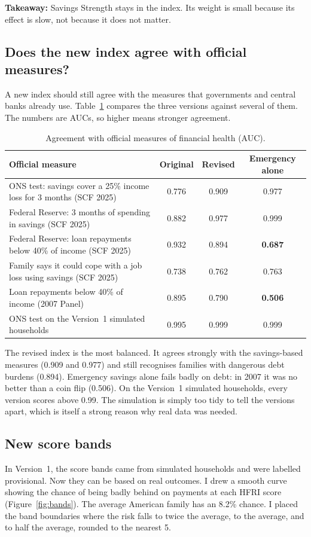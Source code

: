 \documentclass[11pt,a4paper]{article}
\newcommand{\takeaway}[1]{\par\smallskip\noindent\textbf{Takeaway:} #1\par\smallskip}
\newcommand{\pct}{\%}
\begin{document}
\takeaway{Savings Strength stays in the index. Its weight is small because its effect is slow, not because it does not
matter.}

\subsection{Does the new index agree with official measures?}
A new index should still agree with the measures that governments and central banks already use.
Table~\ref{tab:bench} compares the three versions against several of them. The numbers are AUCs, so higher means
stronger agreement.

\begin{table}[H]
\centering\small
\caption{Agreement with official measures of financial health (AUC).}
\label{tab:bench}
\begin{tabular}{>{\raggedright}p{8.4cm}ccc}
\toprule
Official measure & Original & Revised & Emergency alone\\
\midrule
ONS test: savings cover a 25\pct{} income loss for 3 months (SCF 2025) & 0.776 & 0.909 & 0.977\\
Federal Reserve: 3 months of spending in savings (SCF 2025) & 0.882 & 0.977 & 0.999\\
Federal Reserve: loan repayments below 40\pct{} of income (SCF 2025) & 0.932 & 0.894 & \textbf{0.687}\\
Family says it could cope with a job loss using savings (SCF 2025) & 0.738 & 0.762 & 0.763\\
Loan repayments below 40\pct{} of income (2007 Panel) & 0.895 & 0.790 & \textbf{0.506}\\
ONS test on the Version~1 simulated households & 0.995 & 0.999 & 0.999\\
\bottomrule
\end{tabular}
\end{table}

The revised index is the most balanced. It agrees strongly with the savings-based measures (0.909 and 0.977) and still
recognises families with dangerous debt burdens (0.894). Emergency savings alone fails badly on debt: in 2007 it was no
better than a coin flip (0.506). On the Version~1 simulated households, every version scores above 0.99. The simulation
is simply too tidy to tell the versions apart, which is itself a strong reason why real data was needed.

\subsection{New score bands}
In Version~1, the score bands came from simulated households and were labelled provisional. Now they can be based on
real outcomes. I drew a smooth curve showing the chance of being badly behind on payments at each HFRI score
(Figure~\ref{fig:bands}). The average American family has an 8.2\pct{} chance. I placed the band boundaries where the
risk falls to twice the average, to the average, and to half the average, rounded to the nearest 5.
\end{document}
